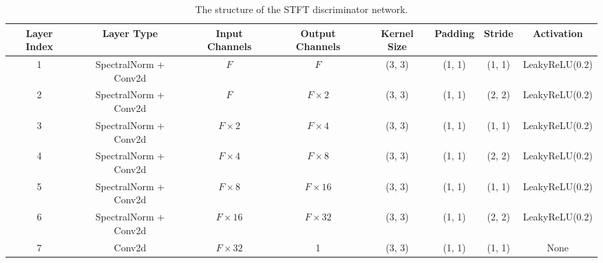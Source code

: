 \begin{table}[]
\footnotesize
\centering
\caption{The structure of the STFT discriminator network.}
\begin{tabular}{cccccccc}
\toprule
\textbf{Layer Index} & \textbf{Layer Type}   & \textbf{Input Channels} & \textbf{Output Channels} & \textbf{Kernel Size} & \textbf{Padding} & \textbf{Stride} & \textbf{Activation} \\ \midrule
1                    & SpectralNorm + Conv2d & $F$                       & $F$                        & (3, 3)               & (1, 1)           & (1, 1)          & LeakyReLU(0.2)      \\
2                    & SpectralNorm + Conv2d & $F$                       & $F\times 2$              & (3, 3)               & (1, 1)           & (2, 2)          & LeakyReLU(0.2)      \\
3                    & SpectralNorm + Conv2d & $F\times 2$             & $F\times 4$              & (3, 3)               & (1, 1)           & (1, 1)          & LeakyReLU(0.2)      \\
4                    & SpectralNorm + Conv2d & $F\times 4$             & $F\times 8$              & (3, 3)               & (1, 1)           & (2, 2)          & LeakyReLU(0.2)      \\
5                    & SpectralNorm + Conv2d & $F\times 8$             & $F\times 16$             & (3, 3)               & (1, 1)           & (1, 1)          & LeakyReLU(0.2)      \\
6                    & SpectralNorm + Conv2d & $F\times 16$            & $F\times 32$             & (3, 3)               & (1, 1)           & (2, 2)          & LeakyReLU(0.2)      \\
7                    & Conv2d                & $F\times 32$            & 1                        & (3, 3)               & (1, 1)           & (1, 1)          & None               \\ \bottomrule
\end{tabular}
\label{tab:dis}
\vspace{-10pt}
\end{table}

